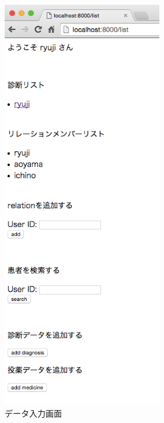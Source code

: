     \begin{figure}[htbp]
      \begin{center}
        \includegraphics[width=7cm, bb=0 0 330 851, clip]{./gazou/DjangoFileio2.png}
      \end{center}
      \caption{データ入力画面}
      \label{DjangoFileio}
    \end{figure}

